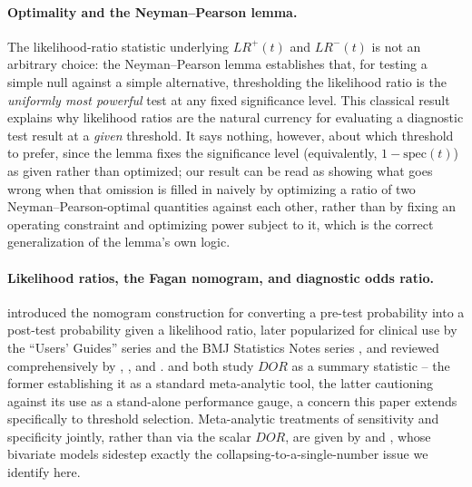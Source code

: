 \documentclass[11pt]{article}
\begin{document}
\paragraph{Optimality and the Neyman--Pearson lemma.} The likelihood-ratio
statistic underlying $LR^+(t)$ and $LR^-(t)$ is not an arbitrary choice: the
Neyman--Pearson lemma \citep{neyman1933} establishes that, for testing a
simple null against a simple alternative, thresholding the likelihood ratio
is the \emph{uniformly most powerful} test at any fixed significance level.
This classical result explains why likelihood ratios are the natural
currency for evaluating a diagnostic test result at a \emph{given}
threshold. It says nothing, however, about which threshold to prefer, since
the lemma fixes the significance level (equivalently, $1-\mathrm{spec}(t)$)
as given rather than optimized; our result can be read as showing what goes
wrong when that omission is filled in naively by optimizing a ratio of two
Neyman--Pearson-optimal quantities against each other, rather than by
fixing an operating constraint and optimizing power subject to it, which is
the correct generalization of the lemma's own logic.

\paragraph{Likelihood ratios, the Fagan nomogram, and diagnostic odds
ratio.} \citet{fagan1975} introduced the nomogram construction for
converting a pre-test probability into a post-test probability given a
likelihood ratio, later popularized for clinical use by the ``Users'
Guides'' series \citep{jaeschke1994a,jaeschke1994b} and the BMJ Statistics
Notes series \citep{altman1994a,altman1994b,altman1994c,deeks2004}, and
reviewed comprehensively by \citet{grimes2005}, \citet{simundic2009}, and
\citet{vanstralen2009}. \citet{glas2003} and \citet{pepe2004} both study
$DOR$ as a summary statistic -- the former establishing it as a standard
meta-analytic tool, the latter cautioning against its use as a
stand-alone performance gauge, a concern this paper extends specifically to
threshold selection. Meta-analytic treatments of sensitivity and specificity
jointly, rather than via the scalar $DOR$, are given by
\citet{rutter2001} and \citet{reitsma2005}, whose bivariate models sidestep
exactly the collapsing-to-a-single-number issue we identify here.
\end{document}
